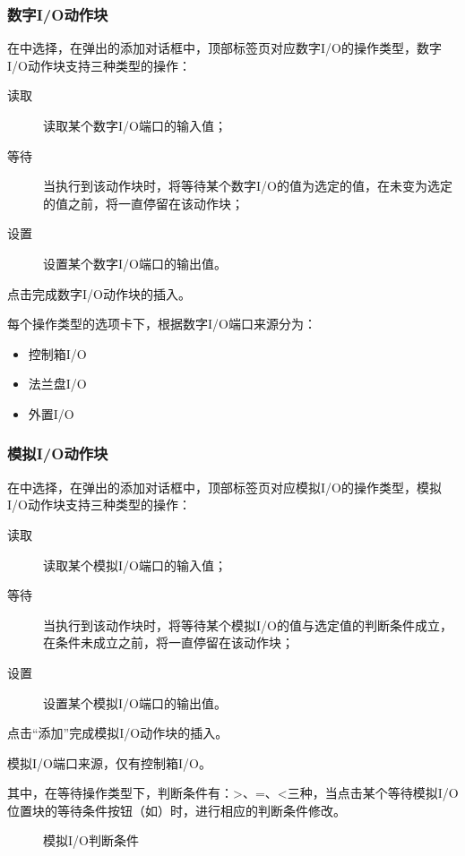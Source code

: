 \subsubsection{数字I/O动作块}
在中选择，在弹出的添加对话框中，顶部标签页对应数字I/O的操作类型，数字I/O动作块支持三种类型的操作：
\begin{description}
\item[读取] 读取某个数字I/O端口的输入值；
\item[等待] 当执行到该动作块时，将等待某个数字I/O的值为选定的值，在未变为选定的值之前，将一直停留在该动作块；
\item[设置] 设置某个数字I/O端口的输出值。
\end{description}

点击完成数字I/O动作块的插入。

每个操作类型的选项卡下，根据数字I/O端口来源分为：
\begin{itemize}
	\item 控制箱I/O
	\item 法兰盘I/O
	\item 外置I/O
\end{itemize}


\subsubsection{模拟I/O动作块}
在中选择，在弹出的添加对话框中，顶部标签页对应模拟I/O的操作类型，模拟I/O动作块支持三种类型的操作：
\begin{description}
\item[读取] 读取某个模拟I/O端口的输入值；
\item[等待] 当执行到该动作块时，将等待某个模拟I/O的值与选定值的判断条件成立，在条件未成立之前，将一直停留在该动作块；
\item[设置] 设置某个模拟I/O端口的输出值。
\end{description}

点击“添加”完成模拟I/O动作块的插入。

模拟I/O端口来源，仅有控制箱I/O。

其中，在等待操作类型下，判断条件有：>、=、<三种，当点击某个等待模拟I/O位置块的等待条件按钮（如）时，进行相应的判断条件修改。

\begin{figure}[ht]
	\centering
	\color{red}{缺图}
	\caption{模拟I/O判断条件}
	\label{fig:模拟IO判断条件}
\end{figure}

